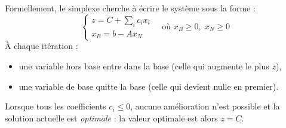 \begin{proposition}
    Formellement, le simplexe cherche à écrire le système sous la forme :
    \[
        \begin{cases}
            z = C + \sum_i c_i x_i \\
            x_B = b - A x_N
        \end{cases}
        \quad \text{où } x_B \geqslant 0, \; x_N \geqslant 0
    \]
    À chaque itération :
    \begin{itemize}
        \item une variable hors base entre dans la base (celle qui augmente le plus $z$),
        \item une variable de base quitte la base (celle qui devient nulle en premier).
    \end{itemize}
    Lorsque tous les coefficients $c_i \leqslant 0$, 
    aucune amélioration n’est possible et la solution actuelle est \emph{optimale} : 
    la valeur optimale est alors $z = C$.
\end{proposition}

